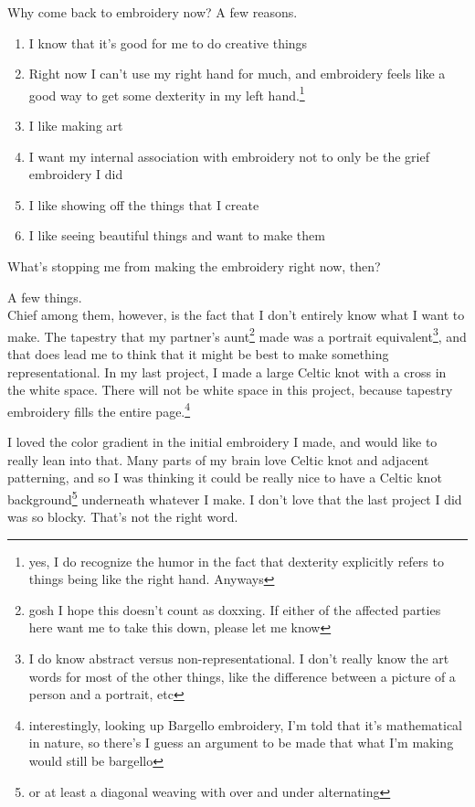 \documentclass[12pt]{article}
\renewcommand{\,}{\textsuperscript{,}}
\begin{document}
Why come back to embroidery now?  
A few reasons.

\begin{enumerate}

\item I know that it's good for me to do creative things  
\item Right now I can't use my right hand for much, and embroidery feels like a good way to get some dexterity in my left hand.\footnote{yes, I do recognize the humor in the fact that dexterity explicitly refers to things being like the right hand. Anyways}  
\item I like making art  
\item I want my internal association with embroidery not to only be the grief embroidery I did  
\item I like showing off the things that I create  
\item I like seeing beautiful things and want to make them

\end{enumerate}

What's stopping me from making the embroidery right now, then?

A few things.\\ Chief among them, however, is the fact that I don't entirely know what I want to make.  
The tapestry that my partner's aunt\footnote{gosh I hope this doesn't count as doxxing. If either of the affected parties here want me to take this down, please let me know} made was a portrait equivalent\footnote{I do know abstract versus non-representational. I don't really know the art words for most of the other things, like the difference between a picture of a person and a portrait, etc}, and that does lead me to think that it might be best to make something representational.  
In my last project, I made a large Celtic knot with a cross in the white space.  
There will not be white space in this project, because tapestry embroidery fills the entire page.\footnote{interestingly, looking up Bargello embroidery, I'm told that it's mathematical in nature, so there's I guess an argument to be made that what I'm making would still be bargello}

I loved the color gradient in the initial embroidery I made, and would like to really lean into that.  
Many parts of my brain love Celtic knot and adjacent patterning, and so I was thinking it could be really nice to have a Celtic knot background\footnote{or at least a diagonal weaving with over and under alternating} underneath whatever I make.  
I don't love that the last project I did was so blocky.  
That's not the right word.
\end{document}
